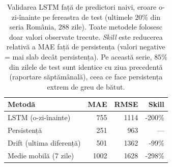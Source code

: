\begin{table}[!htbp]
\centering
\caption[LSTM vs predictori naivi]{Validarea LSTM față de predictori naivi, eroare o-zi-înainte pe fereastra de test (ultimele $20\%$ din seria România, $288$ zile). Toate metodele folosesc doar valori observate trecute. \emph{Skill} este reducerea relativă a MAE față de persistența (valori negative = mai slab decât persistența). Pe această serie, $85\%$ din zilele de test sunt identice cu ziua precedentă (raportare săptămânală), ceea ce face persistența extrem de greu de bătut.}
\label{tab:lstm_baselines}
\small
\begin{tabularx}{\columnwidth}{X r r r}
\toprule
\textbf{Metodă} & \textbf{MAE} & \textbf{RMSE} & \textbf{Skill} \\
\midrule
LSTM (o-zi-înainte) & 755 & 1114 & -200\% \\
Persistență & 251 & 963 & --- \\
Drift (ultima diferență) & 501 & 1362 & -99\% \\
Medie mobilă (7 zile) & 1002 & 1628 & -298\% \\
\bottomrule
\end{tabularx}
\end{table}
